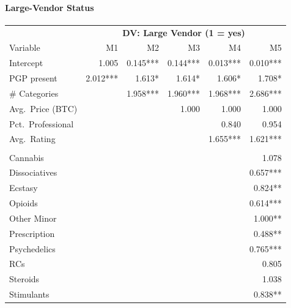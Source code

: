 \documentclass{article}
\begin{document}
\paragraph{Large-Vendor Status}
\begin{table}[htbp]
  \centering
  \scriptsize
  \setlength\tabcolsep{4pt}
  \begin{tabular}{lrrrrr}
    \toprule
    & \multicolumn{5}{c}{\textbf{DV: Large Vendor (1 = yes)}}\\
    \cmidrule(lr){2-6}
    Variable & M1 & M2 & M3 & M4 & M5\\
    \midrule
    Intercept               & 1.005    & 0.145*** & 0.144*** & 0.013*** & 0.010***\\
    PGP present             & 2.012*** & 1.613*   & 1.614*   & 1.606*   & 1.708*\\
    \# Categories           &          & 1.958*** & 1.960*** & 1.968*** & 2.686***\\
    Avg.\ Price (BTC)       &          &          & 1.000    & 1.000    & 1.000\\
    Pct.\ Professional      &          &          &          & 0.840    & 0.954\\
    Avg.\ Rating            &          &          &          & 1.655*** & 1.621***\\
    \addlinespace
    \multicolumn{6}{l}{\emph{Primary drug class}}\\
    Cannabis                &          &          &          &          & 1.078\\
    Dissociatives           &          &          &          &          & 0.657***\\
    Ecstasy                 &          &          &          &          & 0.824**\\
    Opioids                 &          &          &          &          & 0.614***\\
    Other Minor             &          &          &          &          & 1.000**\\
    Prescription            &          &          &          &          & 0.488**\\
    Psychedelics            &          &          &          &          & 0.765***\\
    RCs                     &          &          &          &          & 0.805\\
    Steroids                &          &          &          &          & 1.038\\
    Stimulants              &          &          &          &          & 0.838**\\

\end{tabular}
\end{table}
\end{document}
